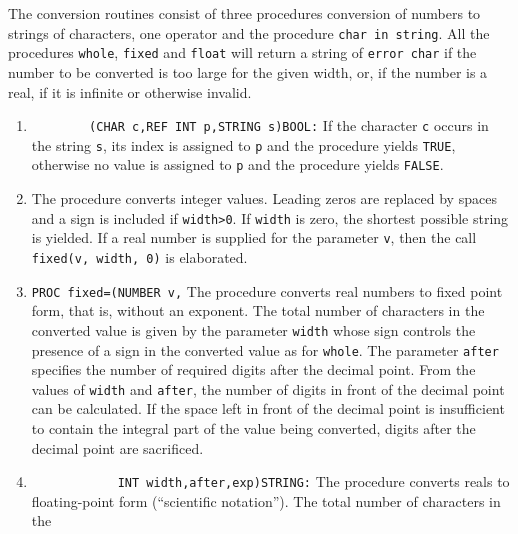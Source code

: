 The conversion routines consist of three procedures conversion of
numbers to strings of characters, one operator and the procedure
\texttt{char in string}. All the procedures \verb|whole|,
\verb|fixed| and \verb|float| will return a string of
\verb|error char| if the number to be converted is too large for the
given width, or, if the number is a real, if it is infinite or
otherwise invalid.
\begin{enumerate}
\item {}\newline
      \verb|        (CHAR c,REF INT p,STRING s)BOOL:|\newline
If the character \verb|c| occurs in the string \verb|s|, its index is
assigned to \verb|p| and the procedure yields \verb|TRUE|, otherwise no
value is assigned to \verb|p| and the procedure yields \verb|FALSE|.
\item {}\newline
The procedure converts integer values. Leading zeros are replaced by
spaces and a sign is included if \verb|width>0|. If \verb|width| is
zero, the shortest possible string is yielded. If a real number is
supplied for the parameter \verb|v|, then the call
\verb|fixed(v, width, 0)| is elaborated.
\item \verb|PROC fixed=(NUMBER v,|\newline
{}\newline
The procedure converts real numbers to fixed point form, that is,
without an exponent. The total number of characters in the converted
value is given by the parameter \verb|width| whose sign controls the
presence of a sign in the converted value as for \verb|whole|. The
parameter \verb|after| specifies the number of required digits after
the decimal point. From the values of \verb|width| and \verb|after|,
the number of digits in front of the decimal point can be calculated.
If the space left in front of the decimal point is insufficient to
contain the integral part of the value being converted, digits after
the decimal point are sacrificed.
\item {}\newline
\verb|            INT width,after,exp)STRING:|\newline
The procedure converts reals to floating-point form
(``scientific notation''). The total number of characters in the

\end{enumerate}
